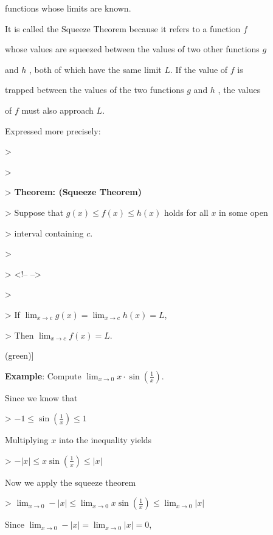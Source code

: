 functions whose limits are known.



It is called the Squeeze Theorem because it refers to a function $f$

whose values are squeezed between the values of two other functions $g$

and $h$ , both of which have the same limit $L$. If the value of $f$ is

trapped between the values of the two functions $g$ and $h$ , the values

of $f$ must also approach $L$.



Expressed more precisely:



> 

>

>    \textbf{Theorem: (Squeeze Theorem)}

>    Suppose that $g(x)\le f(x)\le h(x)$ holds for all $x$ in some open

>     interval containing $c$.

>

> <!-- -->

>

>    If $\lim_{x\to c}g(x)=\lim_{x\to c}h(x)=L$,

>    Then $\lim_{x\to c}f(x)=L$.




(green)]



\textbf{Example}: Compute $\lim_{x\to0}x\cdot\sin\left(\tfrac{1}{x}\right)$.



Since we know that



> $-1 \le \sin(\frac{1}{x}) \le 1$



Multiplying $x$ into the inequality yields



> $-|x| \le x\sin(\frac{1}{x}) \le |x|$



Now we apply the squeeze theorem



> $\lim_{x\to0}-|x|\le\lim_{x\to 0}x\sin(\frac{1}{x})\le\lim_{x\to0}|x|$



Since $\lim_{x\to0}-|x|=\lim_{x\to0}|x|=0$,



